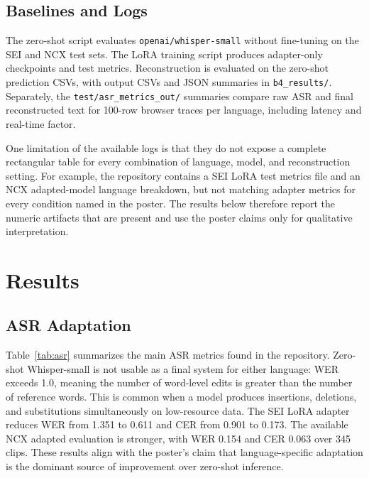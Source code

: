 \documentclass[11pt]{article}
\begin{document}
\subsection{Baselines and Logs}

The zero-shot script evaluates \texttt{openai/whisper-small} without fine-tuning on the SEI and NCX test sets. The LoRA training script produces adapter-only checkpoints and test metrics. Reconstruction is evaluated on the zero-shot prediction CSVs, with output CSVs and JSON summaries in \texttt{b4\_results/}. Separately, the \texttt{test/asr\_metrics\_out/} summaries compare raw ASR and final reconstructed text for 100-row browser traces per language, including latency and real-time factor.

One limitation of the available logs is that they do not expose a complete rectangular table for every combination of language, model, and reconstruction setting. For example, the repository contains a SEI LoRA test metrics file and an NCX adapted-model language breakdown, but not matching adapter metrics for every condition named in the poster. The results below therefore report the numeric artifacts that are present and use the poster claims only for qualitative interpretation.

\section{Results}

\subsection{ASR Adaptation}

Table~\ref{tab:asr} summarizes the main ASR metrics found in the repository. Zero-shot Whisper-small is not usable as a final system for either language: WER exceeds 1.0, meaning the number of word-level edits is greater than the number of reference words. This is common when a model produces insertions, deletions, and substitutions simultaneously on low-resource data. The SEI LoRA adapter reduces WER from 1.351 to 0.611 and CER from 0.901 to 0.173. The available NCX adapted evaluation is stronger, with WER 0.154 and CER 0.063 over 345 clips. These results align with the poster's claim that language-specific adaptation is the dominant source of improvement over zero-shot inference.
\end{document}
